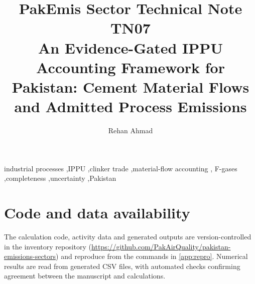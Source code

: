 \documentclass[5p,times,authoryear]{elsarticle}
\begin{document}
\begin{frontmatter}
\title{PakEmis Sector Technical Note TN07\\[4pt]
An Evidence-Gated IPPU Accounting Framework for Pakistan: Cement Material Flows and Admitted Process Emissions}
\author[paqi]{Rehan Ahmad}
\address[paqi]{Pakistan Air Quality Initiative (PAQI), Karachi, Pakistan}
\begin{abstract}

\end{abstract}
\begin{keyword}
industrial processes \sep IPPU \sep clinker trade \sep material-flow accounting \sep
F-gases \sep completeness \sep uncertainty \sep Pakistan
\end{keyword}
\end{frontmatter}



\ReleaseCover






\FloatBarrier





\FloatBarrier

\section*{Code and data availability}
The calculation code, activity data and generated outputs are version-controlled in the
inventory repository (\url{https://github.com/PakAirQuality/pakistan-emissions-sectors}) and reproduce
from the commands in \ref{app:repro}. Numerical results are read from generated CSV
files, with automated checks confirming agreement between the manuscript and calculations.




\appendix
\renewcommand{\thetable}{\arabic{table}}%
\renewcommand{\thefigure}{\arabic{figure}}%

\end{document}
